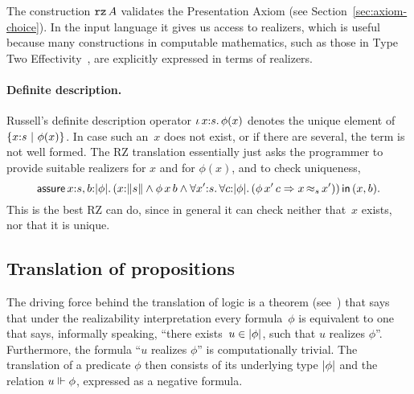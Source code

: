 The construction $\texttt{rz}\,A$ validates the Presentation Axiom (see
Section~\ref{sec:axiom-choice}). In the input language it gives us
access to realizers, which is useful because many constructions in
computable mathematics, such as those in Type Two
Effectivity~\cite{Wei00}, are explicitly expressed in terms of
realizers.


\paragraph{Definite description.}
%
Russell's definite description operator $\iota\,x{:}s{.}\, \phi(x)$ denotes
the unique element of $\{x{:}s\ |\ \phi(x)\}$. In case such an~$x$
does not exist, or if there are several, the term is not well formed.
The RZ translation essentially just asks the programmer to provide
suitable realizers for $x$ and for $\phi(x)$, and to check uniqueness,
%
\begin{equation*}
  \ooblig{x{:}s,b}{\typeOf{\phi}}{
    (\ototal{x}{s} \land \oapp{\oapp{\phi}{x}}{b} \land
    \oforall{x'}{s}{
      \oforall{c}{\typeOf{\phi}}{
        (\oimply{\oapp{\oapp{\phi}{x'}}{c}}{\oper{s}{x}{x'}})
      }
    })
    }{(x,b)}.
\end{equation*}
%
This is the best RZ can do, since in general it can check neither
that~$x$ exists, nor that it is unique.


\subsection{Translation of propositions}
\label{sec:transl-prop}

The driving force behind the translation of logic is a theorem 
(see\ \cite[Thm.~4.4.10]{Troelstra:van-Dalen:88:1}) that says that
under the realizability interpretation every formula~$\phi$ is
equivalent to one that says, informally speaking, ``there exists~$u
\in |\phi|$, such that $u$ realizes $\phi$''. Furthermore, the
formula ``$u$ realizes $\phi$'' is computationally trivial. The
translation of a predicate $\phi$ then consists of its underlying type
$|\phi|$ and the relation $u \Vdash \phi$, expressed as a negative
formula.

